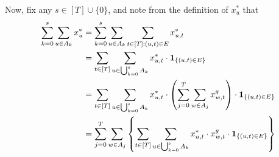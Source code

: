 Now, fix any $s \in [T]\cup \{0\}$, and note from the definition of $x_u^*$ that 
    \begin{align}
        \sum_{k=0}^s \sum_{u \in A_k} x_u^* &= \sum_{k=0}^s  \sum_{u \in A_k} \sum_{t \in [T]: (u,t) \in E} x_{u,t}^* \notag\\
        &= \sum_{t \in [T]} \sum_{u \in \bigcup_{k=0}^s A_k} x_{u, t}^* \cdot \bm{1}_{\{(u,t) \in E \}}\notag\\
        &= \sum_{t \in [T]} \sum_{u \in \bigcup_{k=0}^s A_k} x_{u, t}^* \cdot \left(\sum_{j=0}^T \sum_{w \in A_j} x_{w,t}^g\right) \cdot \bm{1}_{\{(u,t) \in E \}}\notag\\
        &= \sum_{j=0}^T \sum_{w \in A_j} \left \{ \sum_{t \in [T]} \sum_{u \in \bigcup_{k=0}^s A_k} x_{u, t}^* \cdot x_{w,t}^g \cdot \bm{1}_{\{(u,t) \in E\}} \right\}
        \label{eq:lem2_rewriting} 
    \end{align}
